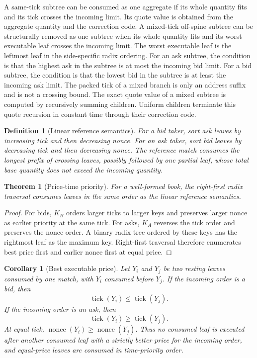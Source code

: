 \documentclass[11pt]{article}
\newtheorem{definition}{Definition}
\newtheorem{theorem}{Theorem}
\newtheorem{corollary}{Corollary}
\DeclareMathOperator{\tick}{tick}
\DeclareMathOperator{\nonce}{nonce}
\begin{document}
A same-tick subtree can be consumed as one aggregate if its whole
quantity fits and its tick crosses the incoming limit.  Its quote value
is obtained from the aggregate quantity and the correction code.  A
mixed-tick off-spine subtree can be structurally removed as one subtree
when its whole quantity fits and its worst executable leaf crosses the
incoming limit.  The worst executable leaf is the leftmost leaf in the
side-specific radix ordering.  For an ask subtree, the condition is that
the highest ask in the subtree is at most the incoming bid limit.  For a
bid subtree, the condition is that the lowest bid in the subtree is at
least the incoming ask limit.  The packed tick of a mixed branch is only
an address suffix and is not a crossing bound.  The exact quote value of
a mixed subtree is computed by recursively summing children.  Uniform
children terminate this quote recursion in constant time through their
correction code.

\begin{definition}[Linear reference semantics]
For a bid taker, sort ask leaves by increasing tick and then decreasing
nonce.  For an ask taker, sort bid leaves by decreasing tick and then
decreasing nonce.  The reference match consumes the longest prefix of
crossing leaves, possibly followed by one partial leaf, whose total base
quantity does not exceed the incoming quantity.
\end{definition}

\begin{theorem}[Price-time priority]
For a well-formed book, the right-first radix traversal consumes leaves
in the same order as the linear reference semantics.
\end{theorem}

\begin{proof}
For bids, \(K_B\) orders larger ticks to larger keys and preserves
larger nonce as earlier priority at the same tick.  For asks, \(K_A\)
reverses the tick order and preserves the nonce order.  A binary radix
tree ordered by these keys has the rightmost leaf as the maximum key.
Right-first traversal therefore enumerates best price first and earlier
nonce first at equal price.
\end{proof}

\begin{corollary}[Best executable price]
Let \(Y_i\) and \(Y_j\) be two resting leaves consumed by one match, with
\(Y_i\) consumed before \(Y_j\).  If the incoming order is a bid, then
\[
  \tick(Y_i) \le \tick(Y_j).
\]
If the incoming order is an ask, then
\[
  \tick(Y_i) \ge \tick(Y_j).
\]
At equal tick, \(\nonce(Y_i)\ge\nonce(Y_j)\).  Thus no consumed leaf is
executed after another consumed leaf with a strictly better price for
the incoming order, and equal-price leaves are consumed in time-priority
order.
\end{corollary}
\end{document}
